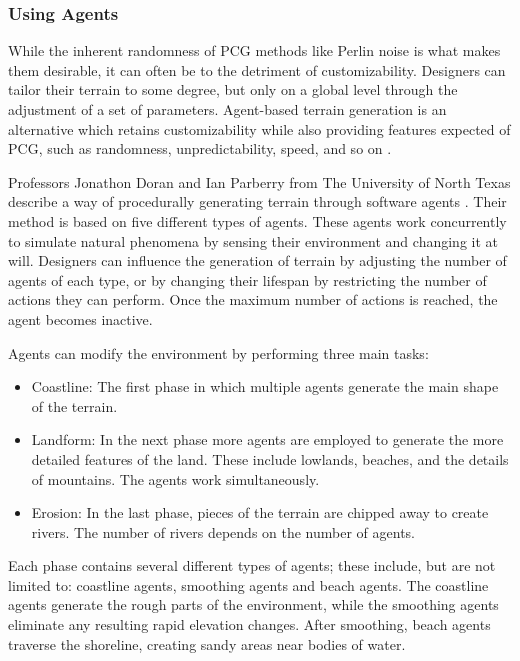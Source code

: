 \subsubsection{Using Agents}
While the inherent randomness of PCG methods like Perlin noise is what makes them desirable, it can often be to the detriment of customizability. Designers can tailor their terrain to some degree, but only on a global level through the adjustment of a set of parameters. Agent-based terrain generation is an alternative which retains customizability while also providing features expected of PCG, such as randomness, unpredictability, speed, and so on \cite[64]{shaker2016procedural}.

Professors Jonathon Doran and Ian Parberry from The University of North Texas describe a way of procedurally generating terrain through software agents \cite{agentbasedTerrain}. Their method is based on five different types of agents. These agents work concurrently to simulate natural phenomena by sensing their environment and changing it at will. Designers can influence the generation of terrain by adjusting the number of agents of each type, or by changing their lifespan by restricting the number of actions they can perform. Once the maximum number of actions is reached, the agent becomes inactive.

Agents can modify the environment by performing three main tasks:

\begin{itemize}
    \item Coastline: The first phase in which multiple agents generate the main shape of the terrain.
    \item Landform: In the next phase more agents are employed to generate the more detailed features of the land. These include lowlands, beaches, and the details of mountains. The agents work simultaneously.
    \item Erosion: In the last phase, pieces of the terrain are chipped away to create rivers. The number of rivers depends on the number of agents.
\end{itemize}
Each phase contains several different types of agents; these include, but are not limited to: coastline agents, smoothing agents and beach agents. The coastline agents generate the rough parts of the environment, while the smoothing agents eliminate any resulting rapid elevation changes. After smoothing, beach agents traverse the shoreline, creating sandy areas near bodies of water.

